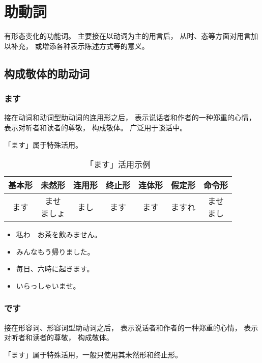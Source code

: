 \section{助動詞}%

有形态变化的功能词。
主要接在以动词为主的用言后，
从时、态等方面对用言加以补充，
或增添各种表示陈述方式等的意义。

\subsection{构成敬体的助动词}%

\subsubsection{ます}%

接在动词和动词型助动词的连用形之后，
表示说话者和作者的一种郑重的心情，
表示对听者和读者的尊敬，
构成敬体。
广泛用于谈话中。

「ます」属于特殊活用。

\begin{table}[h]
  \centering
  \caption{「ます」活用示例}
  \begin{tabular}{c c c c c c c}
    基本形 & 未然形 & 连用形 & 终止形 & 连体形 & 假定形 & 命令形 \\
    \hline
    ます & \makecell{ませ \\ ましょ} & まし & ます & ます & ますれ & \makecell{ませ \\ まし} \\
  \end{tabular}
\end{table}

\begin{itemize}
  \item 私わ　お茶を飲みません。
  \item みんなもう帰りました。
  \item 毎日、六時に起きます。
  \item いらっしゃいませ。
\end{itemize}


\subsubsection{です}%

接在形容词、形容词型助动词之后，
表示说话者和作者的一种郑重的心情，
表示对听者和读者的尊敬，
构成敬体。

「ます」属于特殊活用，一般只使用其未然形和终止形。

